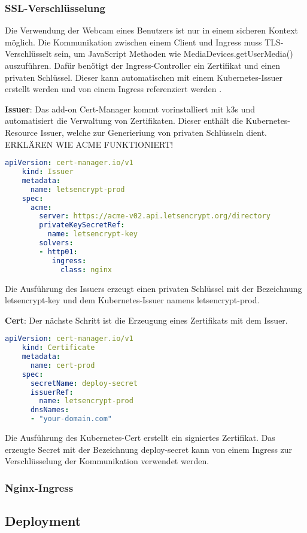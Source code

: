 \subsubsection{SSL-Verschlüsselung}
Die Verwendung der Webcam eines Benutzers ist nur in einem sicheren Kontext möglich.
Die Kommunikation zwischen einem Client und Ingress muss TLS-Verschlüsselt sein, um JavaScript Methoden wie MediaDevices.getUserMedia() auszuführen.
Dafür benötigt der Ingress-Controller ein Zertifikat und einen privaten Schlüssel.
Dieser kann automatischen mit einem Kubernetes-Issuer erstellt werden und von einem Ingress referenziert werden \cite{certmanager}.

\textbf{Issuer}: 
Das add-on Cert-Manager kommt vorinstalliert mit k3s und automatisiert die Verwaltung von Zertifikaten.
Dieser enthält die Kubernetes-Resource Issuer, welche zur Generieriung von privaten Schlüsseln dient.
ERKLÄREN WIE ACME FUNKTIONIERT!

\begin{lstlisting}[caption={issuer.yaml \cite{certmanageracme} },captionpos=b,label={lst:issuer},language=yaml]
    apiVersion: cert-manager.io/v1
    kind: Issuer
    metadata:
      name: letsencrypt-prod
    spec:
      acme:
        server: https://acme-v02.api.letsencrypt.org/directory
        privateKeySecretRef:
          name: letsencrypt-key
        solvers:
        - http01:
           ingress:
             class: nginx

\end{lstlisting}

Die Ausführung des Issuers erzeugt einen privaten Schlüssel mit der Bezeichnung letsencrypt-key und dem Kubernetes-Issuer namens letsencrypt-prod.  

\textbf{Cert}: 
Der nächste Schritt ist die Erzeugung eines Zertifikats mit dem Issuer.

\begin{lstlisting}[caption={cert.yaml \cite{certmanageracme} },captionpos=b,label={lst:cert},language=yaml]
    apiVersion: cert-manager.io/v1
    kind: Certificate
    metadata:
      name: cert-prod
    spec:
      secretName: deploy-secret
      issuerRef: 
        name: letsencrypt-prod
      dnsNames:
      - "your-domain.com"

\end{lstlisting}

Die Ausführung des Kubernetes-Cert erstellt ein signiertes Zertifikat.
Das erzeugte Secret mit der Bezeichnung deploy-secret kann von einem Ingress zur Verschlüsselung der Kommunikation verwendet werden.

\subsubsection{Nginx-Ingress}

\subsection{Deployment}


